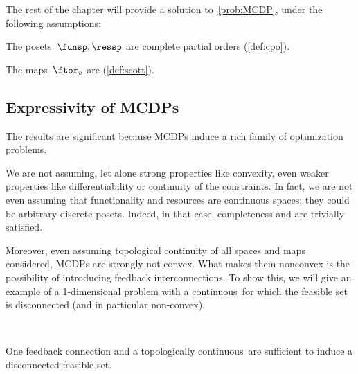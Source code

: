 The rest of the chapter will provide a solution to~\cref{prob:MCDP},
under the following assumptions:

\begin{compactenum}
    \item The posets~$\funsp,\ressp$ are complete partial orders (\cref{def:cpo}).
    \item The maps~$\ftor_v$ are \scottcontinuous (\cref{def:scott}).
\end{compactenum}

\subsection{Expressivity of MCDPs}
The results are significant because MCDPs induce a rich family of optimization problems.

We are not assuming, let alone strong properties like convexity, even weaker properties like differentiability or continuity of the constraints.
In fact, we are not even assuming that functionality and resources are continuous spaces; they could be arbitrary discrete posets.
Indeed, in that case, completeness and \scottcontinuity are trivially satisfied.


Moreover, even assuming topological continuity of all spaces and maps considered, MCDPs are strongly not convex.
What makes them nonconvex is the possibility of introducing feedback interconnections.
To show this, we will give an example of a 1-dimensional problem with a continuous~\ftor for which the feasible set is disconnected (and in particular non-convex).

\begin{marginfigure}
    \centering
    \\
    \caption{One feedback connection and a topologically continuous~\ftor are sufficient to induce a disconnected feasible set.}
    \label{fig:ceil-1}
\end{marginfigure}



